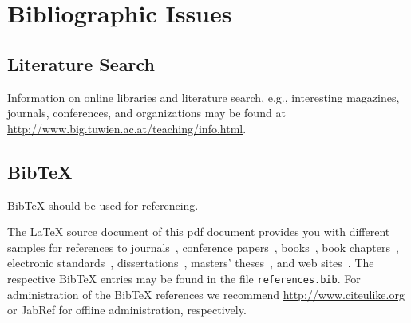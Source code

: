 \documentclass{llncs}
\begin{document}
\section{Bibliographic Issues}

\subsection{Literature Search}

Information on online libraries and literature search, e.g., interesting magazines, journals, conferences, and organizations may be found at \url{http://www.big.tuwien.ac.at/teaching/info.html}.

\subsection{BibTeX}

BibTeX should be used for referencing.

The LaTeX source document of this pdf document provides you with different samples for references to journals~\cite{jour:B2BServices}, conference papers~\cite{proc:TheWebMLApproach}, books~\cite{book:umlatwork}, book chapters~\cite{incoll:ErhardKonrad1992}, electronic standards~\cite{man:BPEL}, dissertations~\cite{phdthesis:manuelWimmer}, masters' theses~\cite{mast:AUMLProfile}, and web sites~\cite{misc:BIGWebsite}. The respective BibTeX entries may be found in the file \texttt{references.bib}. For administration of the BibTeX references we recommend \url{http://www.citeulike.org} or JabRef for offline administration, respectively.



\end{document}
